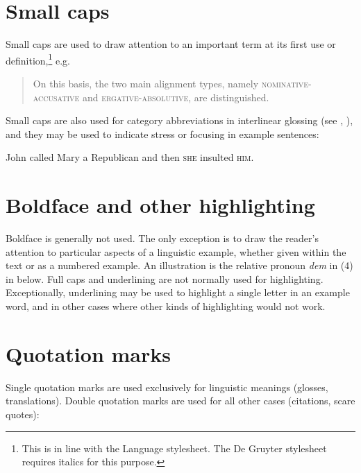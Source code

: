 \documentclass[a4paper]{article}
\newenvironment{gsrexq}{\begin{quote}\color{blue}}{\end{quote}}
\newcommand{\eagsr}{\bgroup\color{blue}\ea}
\newcommand{\zgsr}{\z\egroup}
\begin{document}
\section{Small caps}\label{sec:small-caps}

Small caps are used to draw attention to an important term at its first
use or definition,\footnote{This is in line with the Language stylesheet.
The De Gruyter stylesheet requires italics for this purpose.} e.g.

\begin{gsrexq}
On
this basis, the two main alignment types, namely 
\textsc{nominative-accusative}
and 
\textsc{ergative-absolutive}, 
are distinguished. 
\end{gsrexq}
Small caps are also used
for category abbreviations in interlinear glossing (see , ), and
they may be used to indicate stress or focusing in example sentences:

\eagsr
  John called Mary a Republican and then \textsc{she} insulted \textsc{him}.
\zgsr

\section{Boldface and other
highlighting}\label{sec:boldface-and-other-highlighting}

Boldface is generally not used. The only exception is to draw the
reader's attention to particular aspects of a linguistic example,
whether given within the text or as a numbered example. An illustration
is the relative pronoun \textit{dem} in (4) in  below. Full caps and
underlining are not normally used for highlighting. Exceptionally,
underlining may be used to highlight a single letter in an example word,
and in other cases where other kinds of highlighting would not work.

\section{Quotation marks}\label{sec:quotation-marks}

Single quotation marks are used exclusively for linguistic meanings
(glosses, translations). Double quotation marks are used for all other
cases (citations, scare quotes):
\end{document}
